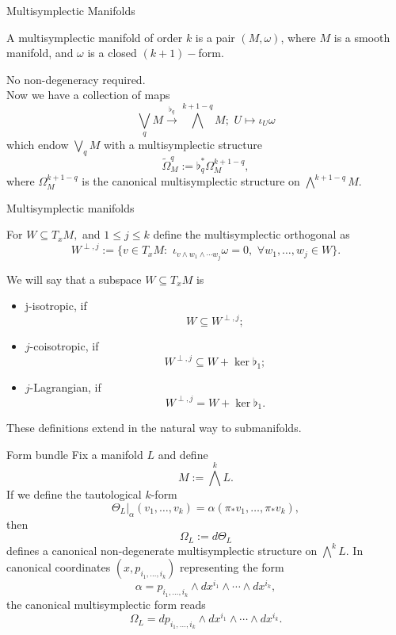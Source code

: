 \begin{frame}{Multisymplectic Manifolds}
    \begin{definition} A \alert{multisymplectic manifold} of order $k$ is a pair $(M, \omega)$, where $M$ is a smooth manifold, and $\omega$ is a closed $(k+1)-$form.
    \end{definition}
    \alert{No non-degeneracy required.\\
    }
    \pause
    Now we have a collection of maps $$\bigvee_ q M \xrightarrow{\flat_q} \bigwedge^{k+1-q} M; \,\, U \mapsto \iota_U \omega$$ which endow $\bigvee_q M$ with a multisymplectic structure $$\widetilde \Omega^q_M := \flat_q^\ast  \Omega^{k+1-q}_M,$$ where $\Omega^{k+1-q}_M$ is the canonical multisymplectic structure on $\bigwedge^{k+1-q} M$.
\end{frame}

\begin{frame}{Multisymplectic manifolds}
    \begin{definition} For $W \subseteq T_x M,$ and $1 \leq j \leq k$ define the \alert{multisymplectic orthogonal} as $$W^{\perp, j}:= \{v \in T_x M: \,\, \iota_{v \wedge w_1 \wedge \cdots w_j} \omega = 0, \,\, \forall w_1, \dots, w_j \in W\}.$$
    \end{definition}
    \pause
    
    \begin{Def} We will say that a subspace $W \subseteq T_x M$ is 
    \begin{itemize}
    \item \alert{j-isotropic}, if $$W  \subseteq W^{\perp, j};$$
        \item \alert{$j$-coisotropic}, if $$W^{\perp,j} \subseteq W + \ker \flat_1;$$
        \item \alert{$j$-Lagrangian}, if $$W^{\perp, j} = W + \ker \flat_1.$$
    \end{itemize}
    \end{Def}
     These definitions extend in the natural way to submanifolds.
\end{frame}
\begin{frame}{Form bundle}
    Fix a manifold $L$ and define $$M := \bigwedge^k L.$$ If we define the \alert{tautological $k$-form} $$\Theta_L |_{\alpha} (v_1, \dots, v_k) = \alpha(\pi_\ast v_1, \dots, \pi_\ast v_k),$$ then $$\Omega_L := d \Theta_L$$ defines a canonical non-degenerate multisymplectic structure on $\bigwedge^k L.$ \pause  In canonical coordinates $(x,p_{i_1, \dots, i_k})$ representing the form $$\alpha = p_{i_1, \dots, i_k} \wedge dx^{i_1} \wedge \cdots \wedge d x^{i_k},$$ \pause the canonical multisymplectic form reads $$\Omega_L = dp_{i_1, \dots, i_k} \wedge dx^{i_1} \wedge \cdots \wedge d x^{i_k}.$$
\end{frame}

